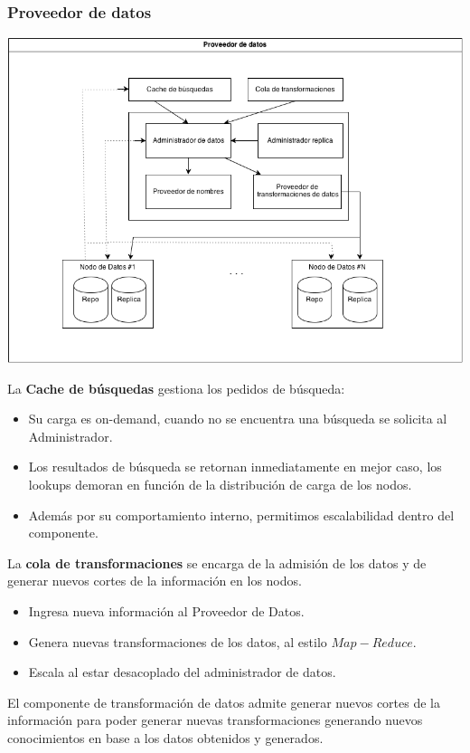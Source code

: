 \subsubsection*{Proveedor de datos}

\includegraphics[scale=0.5]{backend}

La \textbf{Cache de b\'usquedas} gestiona los pedidos  de b\'usqueda:

\begin{itemize}
    \item Su carga es on-demand, cuando no se encuentra una b\'usqueda se solicita al Administrador. 
    \item Los resultados de b\'usqueda se retornan inmediatamente en mejor caso, los lookups demoran en funci\'on de la distribuci\'on de carga de los nodos.
    \item Adem\'as por su comportamiento interno, permitimos escalabilidad dentro del componente.
\end{itemize}

La \textbf{cola de transformaciones} se encarga de la admisi\'on de los datos y de generar nuevos cortes de la informaci\'on en los nodos. 

\begin{itemize}
    \item Ingresa nueva informaci\'on al Proveedor de Datos.
    \item Genera nuevas transformaciones de los datos, al estilo $Map-Reduce$.
    \item Escala al estar desacoplado del administrador de datos.
\end{itemize} 
El componente de transformaci\'on de datos admite generar nuevos cortes de la informaci\'on para poder generar nuevas transformaciones generando nuevos conocimientos en base a los datos obtenidos y generados.

